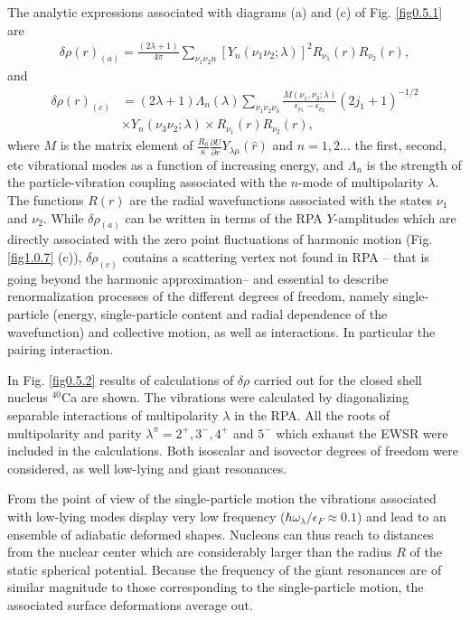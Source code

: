 The analytic expressions associated with diagrams (a) and (c) of Fig. \ref{fig0.5.1} are 
\begin{align}\label{eq0.1.127}
\delta\rho(r)_{(a)}=\frac{(2\lambda+1)}{4\pi}\sum_{\nu_1\nu_2 n}\left[Y_n(\nu_1\nu_2;\lambda)\right]^2 R_{\nu_1}(r)R_{\nu_2}(r),
\end{align}
and
\begin{align}\label{eq0.1.128}
\nonumber \delta\rho(r)_{(c)}&=(2\lambda+1)\Lambda_n(\lambda)\sum_{\nu_1\nu_2\nu_3}\frac{M(\nu_1,\nu_3;\lambda)}{\epsilon_{\nu_1}-\epsilon_{\nu_2}}(2j_1+1)^{-1/2}\\&\times Y_n(\nu_3\nu_2;\lambda)\times R_{\nu_1}(r)R_{\nu_2}(r),
\end{align}
where $M$ is the matrix element of $\frac{R_0}{\kappa}\frac{\partial U}{\partial r}Y_{\lambda\mu}(\hat r)$ and $n=1,2\dots$ the first, second, etc vibrational modes as a function of increasing energy, and $\Lambda_n$ is the strength of the particle-vibration coupling associated with the $n$-mode of multipolarity $\lambda$. The functions $R(r)$ are the radial wavefunctions associated with the states $\nu_1$ and $\nu_2$. While $\delta\rho_{(a)}$ can be written in terms of the RPA $Y$-amplitudes which are directly associated with the zero point fluctuations of harmonic motion (Fig. \ref{fig1.0.7} (c)), $\delta\rho_{(c)}$ contains a scattering vertex not found in RPA -- that is going beyond the harmonic approximation-- and essential to describe renormalization processes of the different degrees of freedom, namely single-particle (energy, single-particle content and radial dependence of the wavefunction) and collective motion, as well as interactions. In particular the pairing interaction. 

In Fig. \ref{fig0.5.2}  results of calculations of $\delta\rho$ carried out for the closed shell nucleus $^{40}$Ca are shown. The vibrations were calculated by diagonalizing separable interactions of multipolarity $\lambda$ in the RPA. All the roots of multipolarity and parity $\lambda^\pi=2^+,3^-,4^+$ and $5^-$ which exhaust the EWSR were included in the calculations. Both isoscalar and isovector degrees of freedom were considered, as well  low-lying and giant resonances.

From the point of view of the single-particle motion the vibrations associated with low-lying modes display very low frequency ($\hbar\omega_\lambda/\epsilon_F\approx0.1$) and lead to an ensemble of adiabatic deformed shapes. Nucleons can thus reach to distances from the nuclear center which are considerably larger than the radius $R$ of the static spherical potential. Because the frequency of the giant resonances are of similar magnitude to those corresponding to the single-particle motion, the associated surface deformations average out. 

